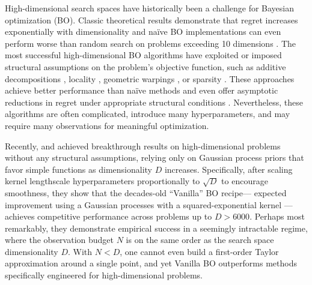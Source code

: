 \documentclass[twoside]{article}
\theoremstyle{plain}
\theoremstyle{definition}
\begin{document}
High-dimensional search spaces have historically been a challenge for Bayesian optimization (BO).
Classic theoretical results demonstrate that regret increases exponentially with dimensionality \citep{srinivas2010gaussian,bull2011convergence}
and na\"ive BO implementations can even perform worse than random search on problems exceeding 10 dimensions \citep{wang2016bayesian, santoni2024comparison}.
The most successful high-dimensional BO algorithms have exploited or imposed structural assumptions on the problem's objective function,
such as additive decompositions \citep{kandasamy2015high,gardner2017discovering,mutny2018efficient,wang2018batched},
locality \citep{eriksson2019scalable,muller2021local,wu2023behavior},
geometric warpings \citep{oh2018bock,kirschner2019adaptive},
or sparsity \citep{eriksson2021high,papenmeier2022increasing}.
These approaches achieve better performance than na\"ive methods
and even offer asymptotic reductions in regret under appropriate structural conditions \citep{kandasamy2015high,wu2023behavior}.
Nevertheless, these algorithms are often complicated, introduce many hyperparameters,
and may require many observations for meaningful optimization.

Recently, \citet{hvarfner2024vanilla} and \citet{xu2025standard} achieved breakthrough results on high-dimensional problems without any structural assumptions,
relying only on Gaussian process priors that favor simple functions as dimensionality $D$ increases. 
Specifically, after scaling kernel lengthscale hyperparameters proportionally to $\sqrt{D}$ to encourage smoothness, they show that the decades-old ``Vanilla'' BO recipe---%
expected improvement using a Gaussian processes with a squared-exponential kernel \citep{movckus1974bayesian,jones1998efficient}---achieves competitive performance across problems up to $D>6000$.
Perhaps most remarkably, they demonstrate empirical success in a seemingly intractable regime,
where the observation budget $N$ is on the same order as the search space dimensionality $D$.
With $N < D$, one cannot even build a first-order Taylor approximation around a single point,
and yet Vanilla BO outperforms methods specifically engineered for high-dimensional problems.
\end{document}
